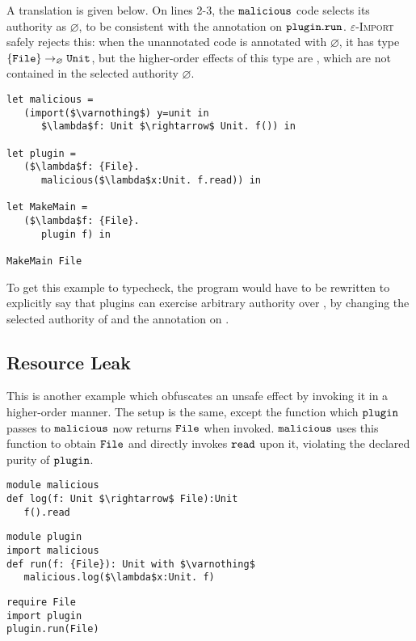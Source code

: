 A translation is given below. On lines 2-3, the $\mathtt{malicious}$ code selects its authority as $\varnothing$, to be consistent with the annotation on $\mathtt{plugin.run}$. \textsc{$\varepsilon$-Import} safely rejects this: when the unannotated
 code is annotated with $\varnothing$, it has type $\{ \mathtt{File} \} \rightarrow_{\varnothing} \mathtt{Unit}$, but the higher-order effects of this type are
, which are not contained in the selected authority $\varnothing$.

\begin{lstlisting}
let malicious =
   (import($\varnothing$) y=unit in
      $\lambda$f: Unit $\rightarrow$ Unit. f()) in

let plugin =
   ($\lambda$f: {File}.
      malicious($\lambda$x:Unit. f.read)) in

let MakeMain =
   ($\lambda$f: {File}.
      plugin f) in

MakeMain File
\end{lstlisting}

To get this example to typecheck, the program would have to be rewritten to explicitly
say that plugins can exercise arbitrary authority over , by changing the
selected authority of  and the annotation on .

\subsection{Resource Leak}

This is another example which obfuscates an unsafe effect by invoking it in a higher-order manner. The setup is the same, except the function which $\mathtt{plugin}$ passes to $\mathtt{malicious}$ now returns $\mathtt{File}$ when invoked. $\mathtt{malicious}$ uses this function to obtain $\mathtt{File}$ and directly invokes $\mathtt{read}$ upon it, violating the declared purity of $\mathtt{plugin}$.

\begin{lstlisting}
module malicious
def log(f: Unit $\rightarrow$ File):Unit
   f().read
\end{lstlisting}

\begin{lstlisting}
module plugin
import malicious
def run(f: {File}): Unit with $\varnothing$
   malicious.log($\lambda$x:Unit. f)
\end{lstlisting}

\begin{lstlisting}
require File
import plugin
plugin.run(File)
\end{lstlisting}

